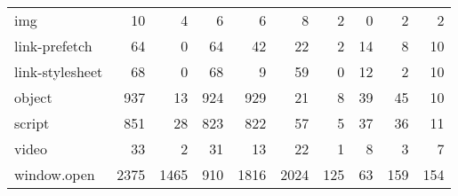 \begin{tabular}{lrrrrrrrrr}
                       img &                               10 &                                  4 &                                      6 &                            6 &                           8 &                                   2 &                                      0 &                             2 &                            2 \\
             link-prefetch &                               64 &                                  0 &                                     64 &                           42 &                          22 &                                   2 &                                     14 &                             8 &                           10 \\
           link-stylesheet &                               68 &                                  0 &                                     68 &                            9 &                          59 &                                   0 &                                     12 &                             2 &                           10 \\
                    object &                              937 &                                 13 &                                    924 &                          929 &                          21 &                                   8 &                                     39 &                            45 &                           10 \\
                    script &                              851 &                                 28 &                                    823 &                          822 &                          57 &                                   5 &                                     37 &                            36 &                           11 \\
                     video &                               33 &                                  2 &                                     31 &                           13 &                          22 &                                   1 &                                      8 &                             3 &                            7 \\
               window.open &                             2375 &                               1465 &                                    910 &                         1816 &                        2024 &                                 125 &                                     63 &                           159 &                          154 \\

\end{tabular}
